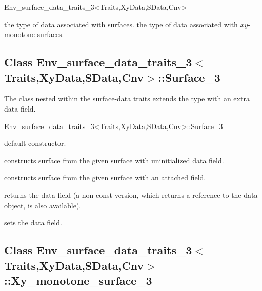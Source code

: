 \begin{ccRefClass}{Env_surface_data_traits_3<Traits,XyData,SData,Cnv>}

    {the type of data associated with surfaces.}
\ccGlue
{}
    {the type of data associated with $xy$-monotone surfaces.}

\ccInheritsFrom

\subsection*{Class Env\_surface\_data\_traits\_3$<$Traits,XyData,SData,Cnv$>$::Surface\_3}

The  class nested within the surface-data traits
extends the  type with an extra data field.

\begin{ccClass}{Env_surface_data_traits_3<Traits,XyData,SData,Cnv>::Surface_3}

\ccInheritsFrom

\ccCreation
{}

    {default constructor.}

    {constructs surface from the given  surface with uninitialized
     data field.}

    {constructs surface from the given  surface with an attached
      field.}

\ccAccessFunctions

  {returns the data field (a non-const version, which returns a reference
   to the data object, is also available).}

  {sets the data field.}

\end{ccClass}

\subsection*{Class Env\_surface\_data\_traits\_3$<$Traits,XyData,SData,Cnv$>$::Xy\_monotone\_surface\_3}


\end{ccRefClass}
